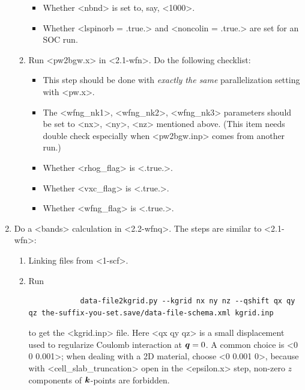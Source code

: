 \documentclass[hyperref, a4paper, 12pt]{report}
\def\texttt#1{<#1>}%
\newcommand{\shortcode}[1]{\texttt{#1}}
\begin{document}
\begin{enumerate}
\begin{enumerate}
\begin{itemize}
            \item Whether \shortcode{nbnd} is set to, say, \shortcode{1000}.
            \item Whether \shortcode{lspinorb = .true.} and \shortcode{noncolin = .true.} 
            are set for an SOC run.
        \end{itemize}
        \item Run \shortcode{pw2bgw.x} in \shortcode{2.1-wfn}.
        Do the following checklist:
        \begin{itemize}
            \item This step should be done 
            with \emph{exactly the same} parallelization setting with \shortcode{pw.x}.
            \item The \shortcode{wfng_nk1}, \shortcode{wfng_nk2}, \shortcode{wfng_nk3} 
            parameters should be set to \shortcode{nx}, \shortcode{ny}, \shortcode{nz}
            mentioned above.
            (This item needs double check especially 
            when \shortcode{pw2bgw.inp} comes from another run.)
            \item Whether \shortcode{rhog_flag} is \shortcode{.true.}.
            \item Whether \shortcode{vxc_flag} is \shortcode{.true.}.
            \item Whether \shortcode{wfng_flag} is \shortcode{.true.}.
        \end{itemize}
    \end{enumerate}
    \item Do a \shortcode{bands} calculation in \shortcode{2.2-wfnq}. 
    The steps are similar to \shortcode{2.1-wfn}:
    \begin{enumerate}
        \item Linking files from \shortcode{1-scf}.
        \item Run 
        \begin{lstlisting}
            data-file2kgrid.py --kgrid nx ny nz --qshift qx qy qz the-suffix-you-set.save/data-file-schema.xml kgrid.inp
        \end{lstlisting}
        to get the \shortcode{kgrid.inp} file.
        Here \shortcode{qx qy qz} is a small displacement 
        used to regularize Coulomb interaction at $\vb*{q} = 0$.
        A common choice is \shortcode{0 0 0.001};
        when dealing with a 2D material, choose \shortcode{0 0.001 0},
        because with \shortcode{cell_slab_truncation} open in the \shortcode{epsilon.x} step,
        non-zero $z$ components of $\vb*{k}$-points are forbidden.

\end{enumerate}
\end{enumerate}
\end{document}
